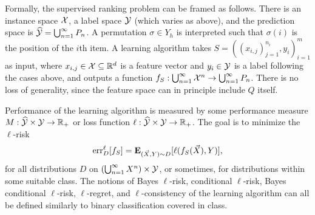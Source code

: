 Formally, the supervised ranking problem can be framed as follows. There is an
instance space ${\mathcal X}$, a label space ${\mathcal Y}$ (which varies as above), and the
prediction space is $\widehat{\mathcal{Y}} = \bigcup_{n=1}^\infty P_n$. A permutation
$\sigma \in Y_h$ is interpreted such that $\sigma(i)$ is the position of the
$i$th item. A learning algorithm
takes $S = ((x_{i,j})_{j=1}^{n_i}, y_i)_{i=1}^m$ as input,
where $x_{i,j} \in {\mathcal X} \subseteq {\mathbb R}^d$ is a feature vector
and $y_i \in {\mathcal Y}$ is a label following the cases above,
and outputs a function
$f_S: \bigcup_{n=1}^\infty {\mathcal X}^n \to \bigcup_{n=1}^\infty P_n$.
There is no loss of generality, since the feature space can in principle 
include $Q$ itself.

Performance of the learning algorithm is measured by some performance measure
$M: \widehat{\mathcal{Y}} \times {\mathcal Y} \to {\mathbb R}_+$ or loss function
$\ell: \widehat{\mathcal{Y}} \times {\mathcal Y} \to {\mathbb R}_+$. The goal is to minimize the $\ell$-risk
\begin{align*}
  \text{err}_D^\ell[f_S] = {\mathbf E}_{(\vec{X}, Y) \sim D} [\ell(f_S(\vec{X}), Y)],
\end{align*}
for all distributions $D$ on $(\bigcup_{n=1}^\infty X^n) \times {\mathcal Y}$, or sometimes,
for distributions within some suitable class.
The notions of Bayes $\ell$-risk, conditional $\ell$-risk,
Bayes conditional $\ell$-risk, $\ell$-regret, and $\ell$-consistency of the
learning algorithm can all be defined similarly to binary classification
covered in class.

